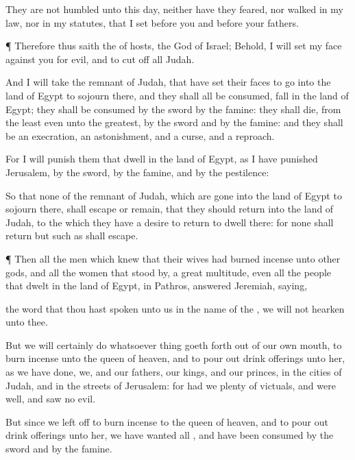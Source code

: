{They are not
humbled
{} unto this
day, neither have they
feared, nor
walked in my
law, nor in my
statutes, that I
set
before you and
before your
fathers.


\par }{\PP {}¶ Therefore thus
saith the
{} of
hosts, the
God of
Israel; Behold, I will
set my
face against you for
evil, and to cut
off all
Judah.

And I will
take the
remnant of
Judah, that have
set their
faces to
go into the
land of
Egypt to
sojourn there, and they shall all be
consumed,
{}
fall in the
land of
Egypt; they shall
{} be
consumed by the
sword
{} by the
famine: they shall
die, from the
least even unto the
greatest, by the
sword and by the
famine: and they shall be an
execration,
{} an
astonishment, and a
curse, and a
reproach.

For I will
punish them that
dwell in the
land of
Egypt, as I have
punished
Jerusalem, by the
sword, by the
famine, and by the
pestilence:

So that none of the
remnant of
Judah, which are
gone into the
land of
Egypt to
sojourn there, shall
escape or
remain, that they should
return into the
land of
Judah, to the which they
have a
desire to
return to
dwell there: for none shall
return but such as shall
escape.


\par }{\PP {}¶ Then all the
men which
knew that their
wives had burned
incense unto
other
gods, and all the
women that stood
by, a
great
multitude, even all the
people that
dwelt in the
land of
Egypt, in
Pathros,
answered
Jeremiah,
saying,

 the
word that thou hast
spoken unto us in the
name of the
{}, we will not
hearken unto thee.

But we will
certainly
do whatsoever
thing goeth
forth out of our own
mouth, to burn
incense unto the
queen of
heaven, and to pour
out drink
offerings unto her, as we have
done, we, and our
fathers, our
kings, and our
princes, in the
cities of
Judah, and in the
streets of
Jerusalem: for
{} had we
plenty of
victuals, and were
well, and
saw no
evil.

But since we left
off to burn
incense to the
queen of
heaven, and to pour
out drink
offerings unto her, we have
wanted all
{}, and have been
consumed by the
sword and by the
famine.

}
